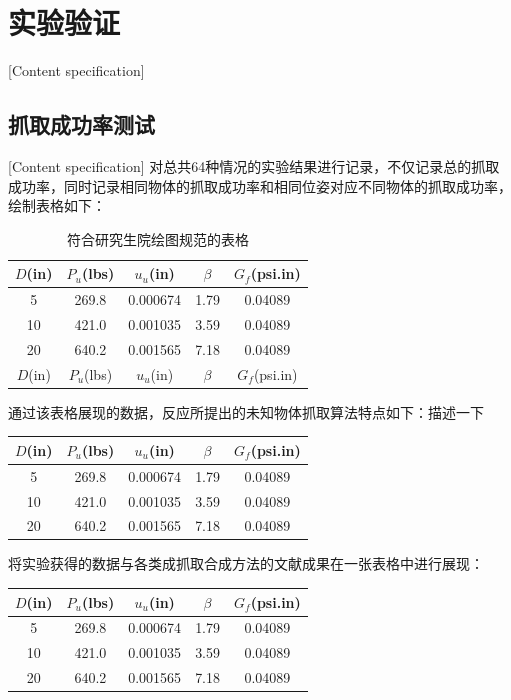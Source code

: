 \documentclass[fontset=fandol,type=bachelor,campus=harbin]{hithesisbook}
\begin{document}
\section{实验验证}[Content specification]
\subsection{抓取成功率测试}[Content specification]
对总共64种情况的实验结果进行记录，不仅记录总的抓取成功率，同时记录相同物体的抓取成功率和相同位姿对应不同物体的抓取成功率，{\color{red}绘制表格如下：}
\begin{table}[htbp]
\caption{符合研究生院绘图规范的表格}
\vspace{0.5em}\centering\wuhao
\begin{tabular}{ccccc}
\toprule[1.5pt]
$D$(in) & $P_u$(lbs) & $u_u$(in) & $\beta$ & $G_f$(psi.in)\\
\midrule[1pt]
 5 & 269.8 & 0.000674 & 1.79 & 0.04089\\
10 & 421.0 & 0.001035 & 3.59 & 0.04089\\
20 & 640.2 & 0.001565 & 7.18 & 0.04089\\
\bottomrule[1.5pt]
$D$(in) & $P_u$(lbs) & $u_u$(in) & $\beta$ & $G_f$(psi.in)\\
\hline
\end{tabular}
\end{table}


通过该表格展现的数据，反应所提出的未知物体抓取算法{\color{red}特点如下：描述一下}
\begin{table}[htbp]
\vspace{0.5em}\centering\wuhao
\begin{tabular}{ccccc}
\toprule[1.5pt]
$D$(in) & $P_u$(lbs) & $u_u$(in) & $\beta$ & $G_f$(psi.in)\\
\midrule[1pt]
 5 & 269.8 & 0.000674 & 1.79 & 0.04089\\
10 & 421.0 & 0.001035 & 3.59 & 0.04089\\
20 & 640.2 & 0.001565 & 7.18 & 0.04089\\
\bottomrule[1.5pt]
\end{tabular}
\end{table}


将实验获得的数据与各类成抓取合成方法的文献成果在一张表格中进行展现：
\begin{table}[htbp]
\vspace{0.5em}\centering\wuhao
\begin{tabular}{ccccc}
\toprule[1.5pt]
$D$(in) & $P_u$(lbs) & $u_u$(in) & $\beta$ & $G_f$(psi.in)\\
\midrule[1pt]
 5 & 269.8 & 0.000674 & 1.79 & 0.04089\\
10 & 421.0 & 0.001035 & 3.59 & 0.04089\\
20 & 640.2 & 0.001565 & 7.18 & 0.04089\\
\bottomrule[1.5pt]
\end{tabular}
\end{table}
\end{document}
